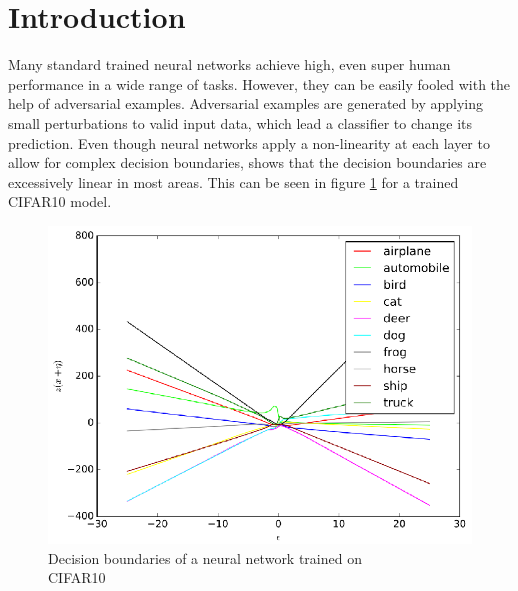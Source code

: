 \documentclass{article}
\begin{document}
\vspace{-0.8cm}

\section{Introduction}
\label{Intro}
Many standard trained neural networks achieve high, even super human performance in a wide range of tasks. However, they can be easily fooled with the help of adversarial examples. Adversarial examples are generated by applying small perturbations to valid input data, which lead a classifier to change its prediction. Even though neural networks apply a non-linearity at each layer to allow for complex decision boundaries, \cite{b27} shows that the decision boundaries are excessively linear in most areas. This can be seen in figure \ref{fig1: Decision boundary of a neural network} for a trained CIFAR10 model. \\

\begin{figure}[H]
    \centering
    \vspace{-0.7cm}
    \includegraphics[scale=0.33]{CIFAR10-decision_boundary.png}
    \vspace{-0.35cm}
    \caption{Decision boundaries of a neural network trained on \\ CIFAR10 \cite{b27}}
    \label{fig1: Decision boundary of a neural network}
    \vspace{-0.2cm}
\end{figure}
\end{document}
